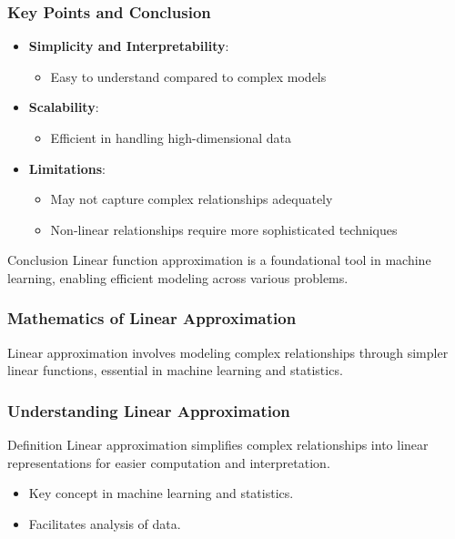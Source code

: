 \documentclass[aspectratio=169]{beamer}
\begin{document}
\begin{frame}[fragile]
    \frametitle{Key Points and Conclusion}
    \begin{itemize}
        \item \textbf{Simplicity and Interpretability}:
            \begin{itemize}
                \item Easy to understand compared to complex models
            \end{itemize}
        \item \textbf{Scalability}:
            \begin{itemize}
                \item Efficient in handling high-dimensional data
            \end{itemize}
        \item \textbf{Limitations}:
            \begin{itemize}
                \item May not capture complex relationships adequately
                \item Non-linear relationships require more sophisticated techniques
            \end{itemize}
    \end{itemize}
    \begin{block}{Conclusion}
        Linear function approximation is a foundational tool in machine learning, enabling efficient modeling across various problems.
    \end{block}
\end{frame}

\begin{frame}[fragile]
    \frametitle{Mathematics of Linear Approximation}
    Linear approximation involves modeling complex relationships through simpler linear functions, essential in machine learning and statistics. 
\end{frame}

\begin{frame}[fragile]
    \frametitle{Understanding Linear Approximation}
    \begin{block}{Definition}
        Linear approximation simplifies complex relationships into linear representations for easier computation and interpretation.
    \end{block}
    
    \begin{itemize}
        \item Key concept in machine learning and statistics.
        \item Facilitates analysis of data.
    \end{itemize}
\end{frame}
\end{document}
